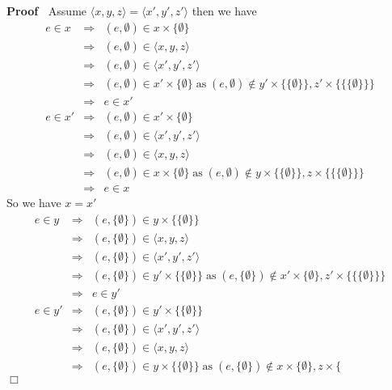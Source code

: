 \documentclass{book}
\newcommand{\nin}{\not\in}
\newcommand{\tmop}[1]{\ensuremath{\operatorname{#1}}}
\newenvironment{proof}{\noindent\textbf{Proof\ }}{\hspace*{\fill}$\Box$\medskip}
\begin{document}
{{\begin{proof}
  Assume $\langle x, y, z \rangle = \langle x', y', z' \rangle$ then we have
  \begin{eqnarray*}
    e \in x & \Rightarrow & (e, \emptyset) \in x \times \{ \emptyset \}\\
    & \Rightarrow & (e, \emptyset) \in \langle x, y, z \rangle\\
    & \Rightarrow & (e, \emptyset) \in \langle x', y', z' \rangle\\
    & \Rightarrow & (e, \emptyset) \in x' \times \{ \emptyset \} \tmop{as}
    (e, \emptyset) \nin y' \times \{ \{ \emptyset \} \}, z' \times \{ \{ \{
    \emptyset \} \} \}\\
    & \Rightarrow & e \in x'\\
    e \in x' & \Rightarrow & (e, \emptyset) \in x' \times \{ \emptyset \}\\
    & \Rightarrow & (e, \emptyset) \in \langle x', y', z' \rangle\\
    & \Rightarrow & (e, \emptyset) \in \langle x, y, z \rangle\\
    & \Rightarrow & (e, \emptyset) \in x \times \{ \emptyset \} \tmop{as} (e,
    \emptyset) \nin y \times \{ \{ \emptyset \} \}, z \times \{ \{ \{
    \emptyset \} \} \}\\
    & \Rightarrow & e \in x
  \end{eqnarray*}
  So we have $x = x'$
  \begin{eqnarray*}
    e \in y & \Rightarrow & (e, \{ \emptyset \}) \in y \times \{ \{ \emptyset
    \} \}\\
    & \Rightarrow & (e, \{ \emptyset \}) \in \langle x, y, z \rangle\\
    & \Rightarrow & (e, \{ \emptyset \}) \in \langle x', y', z' \rangle\\
    & \Rightarrow & (e, \{ \emptyset \}) \in y' \times \{ \{ \emptyset \} \}
    \tmop{as} (e, \{ \emptyset \}) \nin x' \times \{ \emptyset \}, z' \times
    \{ \{ \{ \emptyset \} \} \}\\
    & \Rightarrow & e \in y'\\
    e \in y' & \Rightarrow & (e, \{ \emptyset \}) \in y' \times \{ \{
    \emptyset \} \}\\
    & \Rightarrow & (e, \{ \emptyset \}) \in \langle x', y', z' \rangle\\
    & \Rightarrow & (e, \{ \emptyset \}) \in \langle x, y, z \rangle\\
    & \Rightarrow & (e, \{ \emptyset \}) \in y \times \{ \{ \emptyset \} \}
    \tmop{as} (e, \{ \emptyset \}) \nin x \times \{ \emptyset \}, z \times \{

\end{eqnarray*}
\end{proof}}}
\end{document}
